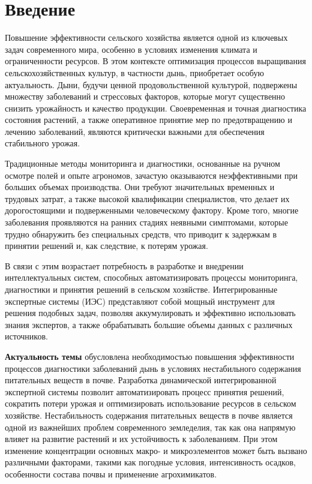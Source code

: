 \chapter*{Введение}
\label{sec:afterwords}

Повышение эффективности сельского хозяйства является одной из ключевых задач современного мира, особенно в условиях изменения климата и ограниченности ресурсов. В этом контексте оптимизация процессов выращивания сельскохозяйственных культур, в частности дынь, приобретает особую актуальность. Дыни, будучи ценной продовольственной культурой, подвержены множеству заболеваний и стрессовых факторов, которые могут существенно снизить урожайность и качество продукции. Своевременная и точная диагностика состояния растений, а также оперативное принятие мер по предотвращению и лечению заболеваний, являются критически важными для обеспечения стабильного урожая.

Традиционные методы мониторинга и диагностики, основанные на ручном осмотре полей и опыте агрономов, зачастую оказываются неэффективными при больших объемах производства. Они требуют значительных временных и трудовых затрат, а также высокой квалификации специалистов, что делает их дорогостоящими и подверженными человеческому фактору. Кроме того, многие заболевания проявляются на ранних стадиях неявными симптомами, которые трудно обнаружить без специальных средств, что приводит к задержкам в принятии решений и, как следствие, к потерям урожая.

В связи с этим возрастает потребность в разработке и внедрении интеллектуальных систем, способных автоматизировать процессы мониторинга, диагностики и принятия решений в сельском хозяйстве. Интегрированные экспертные системы (ИЭС) представляют собой мощный инструмент для решения подобных задач, позволяя аккумулировать и эффективно использовать знания экспертов, а также обрабатывать большие объемы данных с различных источников.

\textbf{Актуальность темы} обусловлена необходимостью повышения эффективности процессов диагностики заболеваний дынь в условиях нестабильного содержания питательных веществ в почве. Разработка динамической интегрированной экспертной системы позволит автоматизировать процесс принятия решений, сократить потери урожая и оптимизировать использование ресурсов в сельском хозяйстве. Нестабильность содержания питательных веществ в почве является одной из важнейших проблем современного земледелия, так как она напрямую влияет на развитие растений и их устойчивость к заболеваниям. При этом изменение концентрации основных макро- и микроэлементов может быть вызвано различными факторами, такими как погодные условия, интенсивность осадков, особенности состава почвы и применение агрохимикатов.

